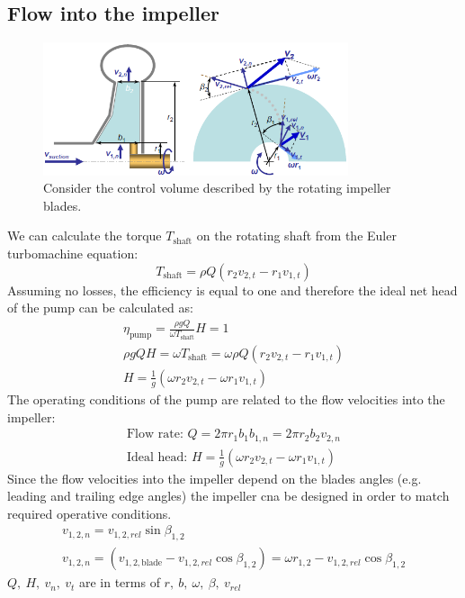 \documentclass[class=report, crop=false, 12pt,a4paper]{standalone}
\begin{document}
\subsection{Flow into the impeller}
\begin{figure}[H]
  \centering
  \includegraphics[width = 0.8\textwidth]{../img/diagram9.png}
  \caption{Consider the control volume described by the rotating impeller blades.}
\end{figure}
We can calculate the torque $T_{\textrm{shaft}}$ on the rotating shaft from the Euler turbomachine equation:
\begin{equation}
  T_{\textrm{shaft}} = \rho Q (r_2 v_{2,t} - r_1 v_{1,t})
\end{equation}
Assuming no losses, the efficiency is equal to one and therefore the ideal net head of the pump can be calculated as:
\begin{gather}
  \eta_{\textrm{pump}} = \frac{\rho g Q}{\omega T_{\textrm{shaft}}}H = 1\\ 
  \rho g QH = \omega T_{\textrm{shaft}} = \omega\rho Q (r_2v_{2,t} - r_1 v_{1,t})\\
  H = \frac{1}{g}(\omega r_2 v_{2,t} - \omega r_1 v_{1,t})
\end{gather}
The operating conditions of the pump are related to the flow velocities into the impeller:
\begin{gather}
  \textrm{Flow rate: } Q = 2\pi r_1 b_1 b_{1,n} = 2\pi r_2 b_2 v_{2,n}\\
  \textrm{Ideal head: } H = \frac{1}{g}(\omega r_2 v_{2,t} - \omega r_1 v_{1,t})
\end{gather}
Since the flow velocities into the impeller depend on the blades angles (e.g. leading and trailing edge angles) the impeller cna be designed in order to match required operative conditions.
\begin{gather}
  v_{1,2,n} = v_{1,2,rel} \sin{\beta_{1,2}}\\
  v_{1,2,n} = (v_{1,2,\textrm{blade}} - v_{1,2,rel} \cos{\beta_{1,2}}) = \omega r_{1,2} - v_{1,2,rel} \cos{\beta_{1,2}}
\end{gather}
$Q, \ H, \ v_n, \ v_t$ are in terms of $r, \ b, \ \omega, \ \beta, \ v_{rel}$
\end{document}
